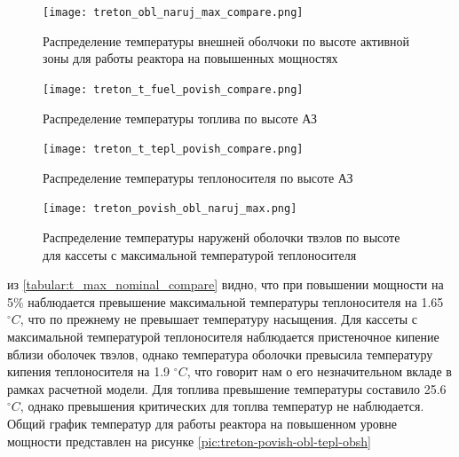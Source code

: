 \begin{figure}[H]
	\begin{center}
		\texttt{[image: treton\_obl\_naruj\_max\_compare.png]}
		\caption{Распределение температуры внешней оболчоки по высоте активной зоны для работы реактора на повышенных мощностях }
		\label{pic:treton-obl-naruj-max-compare} %
	\end{center}
\end{figure}

\begin{figure}[H]
	\begin{center}
		\texttt{[image: treton\_t\_fuel\_povish\_compare.png]}
		\caption{Распределение температуры топлива по высоте АЗ}
		\label{pic:treton-t-fuel-povish-compare} %
	\end{center}
\end{figure}

\begin{figure}[H]
	\begin{center}
		\texttt{[image: treton\_t\_tepl\_povish\_compare.png]}
		\caption{Распределение температуры теплоносителя по высоте АЗ}
		\label{pic:treton-t-tepl-povish-compare} %
	\end{center}
\end{figure}

\begin{figure}[H]
	\begin{center}
		\texttt{[image: treton\_povish\_obl\_naruj\_max.png]}
		\caption{Распределение температуры наруженй оболочки твэлов по высоте для кассеты с максимальной температурой теплоносителя}
		\label{pic:treton-povish-obl-naruj-max} %
	\end{center}
\end{figure}

из \ref{tabular:t_max_nominal_compare} видно, что при повышении мощности на 5\% наблюдается превышение максимальной температуры теплоносителя на 1.65 $^\circ C$, что по прежнему не превышает температуру насыщения. Для кассеты с максимальной температурой теплоносителя наблюдается пристеночное кипение вблизи оболочек твэлов, однако температура оболочки превысила температуру кипения теплоносителя на 1.9 $^\circ C$, что говорит нам о его незначительном вкладе в рамках расчетной модели.
Для топлива превышение температуры составило 25.6 $^\circ C$, однако превышения критических для топлва температур не наблюдается. Общий график температур для работы реактора на повышенном уровне мощности представлен на рисунке \ref{pic:treton-povish-obl-tepl-obsh}


